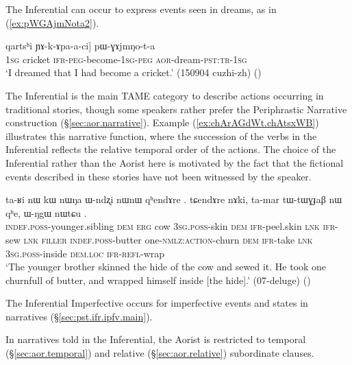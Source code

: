 The Inferential can occur to express events seen in dreams, as in (\ref{ex:pWGAjmNota2}).

\begin{exe}
\ex \label{ex:pWGAjmNota2}
 \gll [aʑo [...] qartsʰi ɲɤ-k-ɤpa-a-ci] pɯ-ɣɤjmŋo-t-a \\
\textsc{1sg} {  } cricket \textsc{ifr}-\textsc{peg}-become-\textsc{1sg}-\textsc{peg} \textsc{aor}-dream-\textsc{pst}:\textsc{tr}-\textsc{1sg} \\
\glt `I dreamed that I had become a cricket.' (150904 cuzhi-zh) 
()
\end{exe}

The Inferential is the main TAME category to describe actions occurring in traditional stories, though some speakers rather prefer the Periphrastic Narrative construction (§\ref{sec:aor.narrative}). Example (\ref{ex:chArAGdWt.chAtsxWB}) illustrates this narrative function, where the succession of the verbs in the Inferential reflects the relative temporal order of the actions. The choice of the Inferential rather than the Aorist here is motivated by the fact that the fictional events described in these stories have not been witnessed by the speaker. 


\begin{exe}
\ex \label{ex:chArAGdWt.chAtsxWB}
 \gll ta-ʁi nɯ kɯ nɯŋa ɯ-ndʐi nɯnɯ  qʰendɤre . tɕendɤre nɤki, ta-mar tɯ-tɯɣɟaβ nɯ  qʰe, ɯ-ŋgɯ nɯtɕu . \\
 \textsc{indef}.\textsc{poss}-younger.sibling \textsc{dem} \textsc{erg} cow \textsc{3sg}.\textsc{poss}-skin \textsc{dem} \textsc{ifr}-peel.skin \textsc{lnk} \textsc{ifr}-sew \textsc{lnk} \textsc{filler} \textsc{indef}.\textsc{poss}-butter one-\textsc{nmlz}:\textsc{action}-churn \textsc{dem} \textsc{ifr}-take \textsc{lnk} \textsc{3sg}.\textsc{poss}-inside \textsc{dem}.\textsc{loc} \textsc{ifr}-\textsc{refl}-wrap \\
 \glt `The younger brother skinned the hide of the cow and sewed it. He took one churnfull of butter, and wrapped himself inside [the hide].' (07-deluge)
()
\end{exe}

The Inferential Imperfective occurs for imperfective events and states in narratives (§\ref{sec:pst.ifr.ipfv.main}).

In narratives told in the Inferential, the Aorist is restricted to temporal (§\ref{sec:aor.temporal}) and relative (§\ref{sec:aor.relative}) subordinate clauses.

